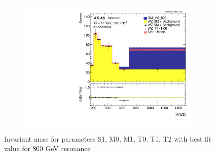 \documentclass[../Bachelorarbeit.tex]{subfiles}
\begin{document}
\begin{figure}[h]
\begin{subfigure}{0.3\textwidth}
    \end{subfigure}
    \begin{subfigure}{0.3\textwidth}
        \includegraphics[width=\textwidth]{Plots/ALL_MWZ_final/GM_H5_800/T1/2022-05-07/VBSSR/all_VV_MWZ_vbs.pdf}
    \end{subfigure}

    \caption{Invariant mass for parameters S1, M0, M1, T0, T1, T2 with best fit value for 800 GeV resonance}
    \label{fig:all_mwz_800}
\end{figure}
\end{document}
